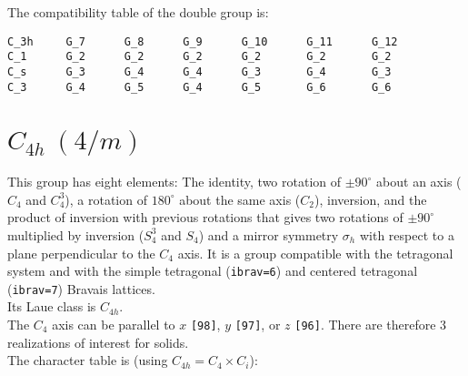 \documentclass[12pt,a4paper,twoside]{report}
\begin{document}
The compatibility table of the double group is:

\begin{tcolorbox}
\begin{footnotesize}
\begin{verbatim}
C_3h     G_7      G_8      G_9      G_10      G_11      G_12
C_1      G_2      G_2      G_2      G_2       G_2       G_2
C_s      G_3      G_4      G_4      G_3       G_4       G_3
C_3      G_4      G_5      G_4      G_5       G_6       G_6
\end{verbatim}
\end{footnotesize}
\end{tcolorbox}

\newpage
{\color{coral}\section{$C_{4h}\ (4/m)$}}  
\color{black}
This group has eight elements: The identity, two rotation of $\pm90^\circ$ 
about an axis ($C_4$ and $C_4^3$), a rotation of $180^\circ$ about the
same axis ($C_2$), inversion, and the product of inversion with previous
rotations that gives two rotations of $\pm90^\circ$ multiplied by inversion 
($S_4^3$ and $S_4$) and a mirror symmetry $\sigma_h$ with respect to a plane 
perpendicular to the $C_4$ axis.  
It is a group compatible with the tetragonal system and with the  
simple tetragonal (\texttt{ibrav=6}) and centered tetragonal (\texttt{ibrav=7})
Bravais lattices. \\ 
Its Laue class is $C_{4h}$. \\
The $C_4$ axis can be parallel to $x$ \texttt{[98]}, $y$ \texttt{[97]}, 
or $z$ \texttt{[96]}. There are therefore
$3$ realizations of interest for solids. \\
The character table is (using $C_{4h}=C_4 \times C_i$):
\end{document}

